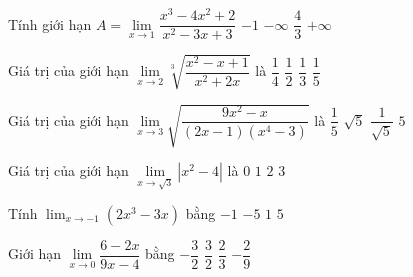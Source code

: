 \begin{ex}%
	Tính giới hạn $A=\lim\limits_{x \to 1} \dfrac{x^3-4x^2+2}{x^2-3x+3}$ 
	\choice 
		{\True  $-1$}
		{$-\infty$} 
		 {$\dfrac{4}{3}$}
		{$+\infty$} 
\end{ex}

\begin{ex}%
	Giá trị  của giới hạn $\lim\limits_{x\to 2}\sqrt[3]{\dfrac{x^2-x+1}{x^2+2x}}$ là
	 \choice
		{$\dfrac{1}{4}$} 
		 {\True $\dfrac{1}{2}$}
		 {$\dfrac{1}{3}$}
		{$\dfrac{1}{5}$} 
\end{ex}

\begin{ex}%
	Giá trị của giới hạn $\lim\limits_{x\to 3}\sqrt{\dfrac{9x^2-x}{(2x-1)(x^4-3)}}$ là 
	\choice 
		 {$\dfrac{1}{5}$}
		{$\sqrt 5$} 
		{\True  $\dfrac{1}{\sqrt 5}$}
		{$5$} 
\end{ex}

\begin{ex}%
	Giá trị  của giới hạn $\lim\limits_{x\to\sqrt 3}|x^2-4|$ là
	\choice 
		{$0$} 
		{\True  $1$}
		 {$2$}
		{$3$} 
\end{ex}

\begin{ex}%
	Tính $\displaystyle\lim_{x\to-1}\left(2x^3-3x\right)$  bằng
	 \choice
		{$-1$} 
		 {$-5$}
		{\True $1$} 
		 {$5$}
\end{ex}

\begin{ex}%
	 Giới hạn $\lim \limits_{x \to 0} \dfrac{6 - 2 x}{9 x - 4}$ bằng
	\choice 
		{ \True $-  \dfrac{3}{2}$}
		{  $\dfrac{3}{2}$}
		{ $\dfrac{2}{3}$} 
		{ $- \dfrac{2}{9}$} 
\end{ex}

